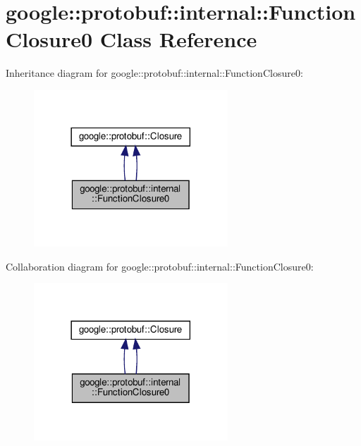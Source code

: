 \hypertarget{classgoogle_1_1protobuf_1_1internal_1_1FunctionClosure0}{}\section{google\+:\+:protobuf\+:\+:internal\+:\+:Function\+Closure0 Class Reference}
\label{classgoogle_1_1protobuf_1_1internal_1_1FunctionClosure0}


Inheritance diagram for google\+:\+:protobuf\+:\+:internal\+:\+:Function\+Closure0\+:
\nopagebreak
\begin{figure}[H]
\begin{center}
\leavevmode
\includegraphics[width=206pt]{classgoogle_1_1protobuf_1_1internal_1_1FunctionClosure0__inherit__graph}
\end{center}
\end{figure}


Collaboration diagram for google\+:\+:protobuf\+:\+:internal\+:\+:Function\+Closure0\+:
\nopagebreak
\begin{figure}[H]
\begin{center}
\leavevmode
\includegraphics[width=206pt]{classgoogle_1_1protobuf_1_1internal_1_1FunctionClosure0__coll__graph}
\end{center}
\end{figure}
